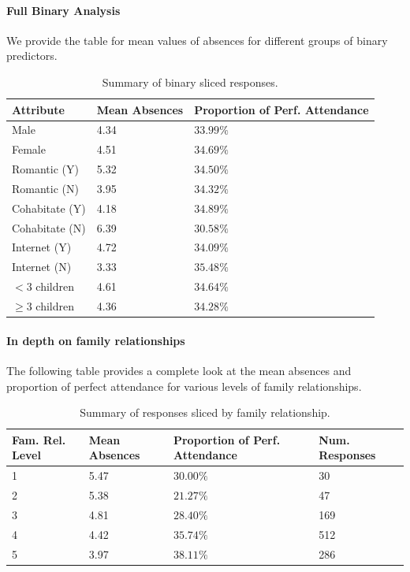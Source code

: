\documentclass[12pt, titlepage]{article}
\begin{document}
	\paragraph{Full Binary Analysis} We provide the table for mean values of absences for different groups of binary predictors.
	
	\begin{table}[h!]
		\centering
		\begin{tabular}{|l|l|l|}
			\hline
			Attribute & Mean Absences & Proportion of Perf. Attendance \\
			\hline
			Male & 4.34 & $33.99\%$ \\
			Female & 4.51 & $34.69\%$ \\
			\hline
			Romantic (Y) & 5.32 & $34.50\%$ \\
			Romantic (N) & 3.95 & $34.32\%$ \\
			\hline
			Cohabitate (Y) & 4.18 & $34.89\%$ \\
			Cohabitate (N) & 6.39 & $30.58\%$ \\
			\hline
			Internet (Y) & 4.72 & $34.09\%$ \\
			Internet (N) & 3.33 & $35.48\%$ \\
			\hline
			$<3$ children & 4.61 & $34.64\%$ \\
			$\geq 3$ children & 4.36 & $34.28\%$ \\
			\hline
		\end{tabular}
	\caption{Summary of binary sliced responses.}
	\end{table}
	
	\paragraph{In depth on family relationships} The following table provides a complete look at the mean absences and proportion of perfect attendance for various levels of family relationships.
	
	\begin{table}[h!]
		\begin{tabular}{|l|l|l|l|}
			\hline
			Fam. Rel. Level & Mean Absences & Proportion of Perf. Attendance & Num. Responses \\
			\hline
			1 & 5.47 & $30.00\%$ & 30 \\
			2 & 5.38 & $21.27\%$ & 47 \\
			3 & 4.81 & $28.40\%$ & 169 \\
			4 & 4.42 & $35.74\%$ & 512 \\
			5 & 3.97 & $38.11\%$ & 286 \\
			\hline
		\end{tabular}
	\caption{Summary of responses sliced by family relationship.}
	\end{table}
\end{document}
